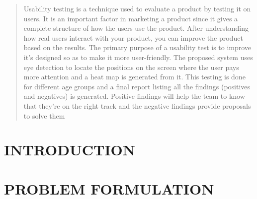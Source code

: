 \documentclass[12pt,a4paper,final]{extreport}
\begin{document}
\begin{quote}
	Usability testing is a technique used to evaluate a product by testing it on users. It is an
	important factor in marketing a product since it gives a complete structure of how the users use
	the product.
	After understanding how real users interact with your product, you can improve the product
	based on the results. The primary purpose of a usability test is to improve it’s designed so as to
	make it more user-friendly.
	The proposed system uses eye detection to locate the positions on the screen where the user
	pays more attention and a heat map is generated from it. This testing is done for different age
	groups and a final report listing all the findings (positives and negatives) is generated. Positive
	findings will help the team to know that they’re on the right track and the negative findings
	provide proposals to solve them


\end{quote}

\newpage
\tableofcontents
{}



\newpage
\listoffigures 
{}

\clearpage
{}
\chead{}
\rhead{}
\cfoot{}
\rfoot{\thepage}
\renewcommand{\headrulewidth}{0.4pt}
\renewcommand{\footrulewidth}{0.4pt}
\pagestyle{fancy}



\chapter{INTRODUCTION}
\noindent



\newpage
\chapter{PROBLEM FORMULATION}
\paragraph{}
\end{document}
